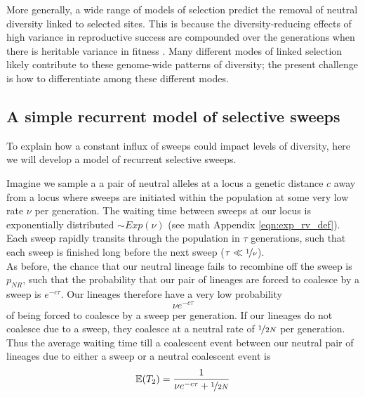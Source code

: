 More generally, a wide range of models of selection predict the removal of neutral
diversity linked to selected sites. This is because the diversity-reducing effects of high variance in reproductive success are compounded over the generations when there is heritable variance in fitness 
\citep{Robertson:61,Santiago:95,Santiago:98,Barton:00}.  Many
different modes of linked selection likely contribute to these
genome-wide patterns of diversity; the present challenge is how to
differentiate among these different modes.


\subsection{A simple recurrent model of selective sweeps}
To explain how a constant influx of sweeps could impact levels of
diversity, here we will develop a model of recurrent
selective sweeps.

Imagine we sample a a pair of neutral alleles at a locus a genetic distance $c$ away from a locus where
sweeps are initiated within the population at some very low rate $\nu$
per generation. The waiting time between sweeps
at our locus is exponentially distributed $\sim Exp(\nu)$ (see math
Appendix \eqn \eqref{eqn:exp_rv_def}). Each sweep rapidly transits through the population in $\tau$
generations, such that each sweep is finished long before the next
sweep ($\tau \ll \nicefrac{1}{\nu}$). \\

As before, the chance that our neutral lineage fails to recombine
off the sweep is $p_{NR}$, such that the probability that
our pair of lineages are forced to coalesce by a sweep is $e^{-c \tau}$. Our
lineages therefore have a very low probability
\begin{equation}
\nu e^{-c \tau}
\end{equation}
of being forced to coalesce by a sweep per generation. If our lineages do not coalesce due to a sweep, they coalesce at a neutral rate of $\nicefrac{1}{2N}$ per generation. Thus the average
waiting time till a coalescent event between our neutral pair of
lineages due to either a sweep or a neutral coalescent event is
\begin{equation}
\mathbb{E}(T_2) = \frac{1}{\nu e^{-c \tau} + \nicefrac{1}{2N}}
\end{equation}

